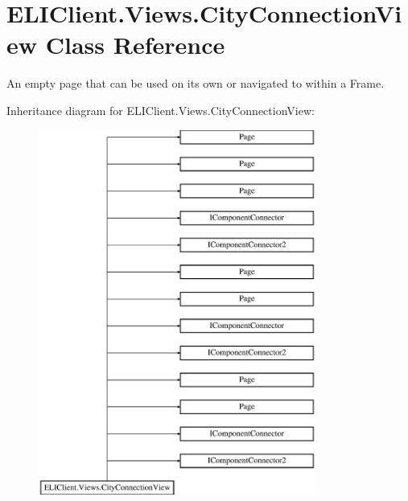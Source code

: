 \hypertarget{class_e_l_i_client_1_1_views_1_1_city_connection_view}{}\section{E\+L\+I\+Client.\+Views.\+City\+Connection\+View Class Reference}
\label{class_e_l_i_client_1_1_views_1_1_city_connection_view}


An empty page that can be used on its own or navigated to within a Frame.  


Inheritance diagram for E\+L\+I\+Client.\+Views.\+City\+Connection\+View\+:\begin{figure}[H]
\begin{center}
\leavevmode
\includegraphics[height=12.000000cm]{d6/d16/class_e_l_i_client_1_1_views_1_1_city_connection_view}
\end{center}
\end{figure}
